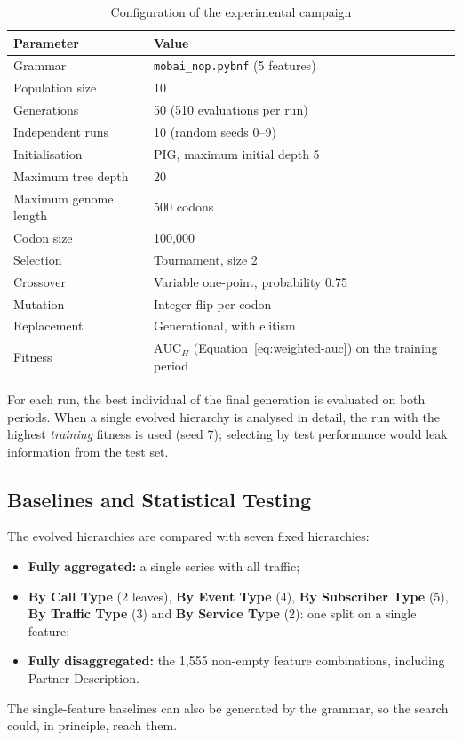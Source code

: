 \begin{table}[htbp]
    \centering
    \caption{Configuration of the experimental campaign}
    \label{tab:ge-config}
    \begin{tabular}{ll}
        \toprule
        Parameter & Value \\
        \midrule
        Grammar & \texttt{mobai\_nop.pybnf} (5 features) \\
        Population size & 10 \\
        Generations & 50 (510 evaluations per run) \\
        Independent runs & 10 (random seeds 0--9) \\
        Initialisation & \ac{PIG}, maximum initial depth 5 \\
        Maximum tree depth & 20 \\
        Maximum genome length & 500 codons \\
        Codon size & 100{,}000 \\
        Selection & Tournament, size 2 \\
        Crossover & Variable one-point, probability 0.75 \\
        Mutation & Integer flip per codon \\
        Replacement & Generational, with elitism \\
        Fitness & $\mathrm{AUC}_H$ (Equation~\ref{eq:weighted-auc}) on the training period \\
        \bottomrule
    \end{tabular}
\end{table}

For each run, the best individual of the final generation is evaluated on both periods.
When a single evolved hierarchy is analysed in detail, the run with the highest \emph{training} fitness is used (seed 7); selecting by test performance would leak information from the test set.

\subsection{Baselines and Statistical Testing}

The evolved hierarchies are compared with seven fixed hierarchies:
\begin{itemize}
    \item \textbf{Fully aggregated:} a single series with all traffic;
    \item \textbf{By Call Type} (2 leaves), \textbf{By Event Type} (4), \textbf{By Subscriber Type} (5), \textbf{By Traffic Type} (3) and \textbf{By Service Type} (2): one split on a single feature;
    \item \textbf{Fully disaggregated:} the 1{,}555 non-empty feature combinations, including Partner Description.
\end{itemize}
The single-feature baselines can also be generated by the grammar, so the search could, in principle, reach them.


